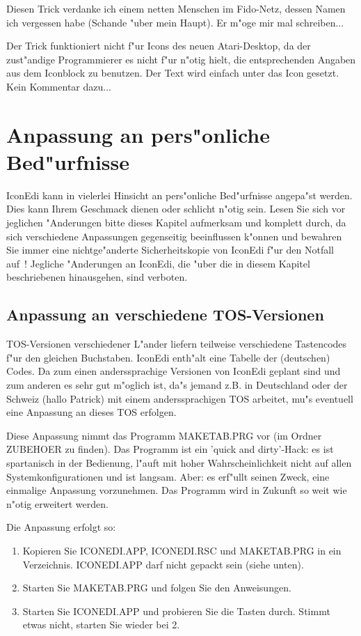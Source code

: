 Diesen Trick verdanke ich einem netten Menschen im Fido-Netz, dessen
Namen ich vergessen habe (Schande "uber mein Haupt). Er m"oge mir mal 
schreiben...

Der Trick funktioniert nicht f"ur Icons des neuen Atari-Desktop,
da der zust"andige Programmierer es nicht f"ur n"otig hielt, die
entsprechenden Angaben aus dem Iconblock zu benutzen. Der Text
wird einfach unter das Icon gesetzt. Kein Kommentar dazu...


%
\chapter{Anpassung an pers"onliche Bed"urfnisse}
IconEdi kann in vielerlei Hinsicht an pers"onliche Bed"urfnisse
angepa"st werden. Dies kann Ihrem Geschmack dienen oder schlicht 
n"otig sein. Lesen Sie sich vor jeglichen "Anderungen bitte dieses
Kapitel aufmerksam und komplett durch, da sich verschiedene 
Anpassungen gegenseitig beeinflussen k"onnen und bewahren Sie immer 
eine nichtge"anderte Sicherheitskopie von IconEdi f"ur den Notfall 
auf~! Jegliche "Anderungen an IconEdi, die "uber die in diesem 
Kapitel beschriebenen hinausgehen, sind verboten.

\section{Anpassung an verschiedene TOS-Versionen}
TOS-Versionen verschiedener L"ander liefern teilweise
verschiedene Tastencodes f"ur den gleichen Buchstaben.
IconEdi enth"alt eine Tabelle der (deutschen) Codes.
Da zum einen anderssprachige Versionen von IconEdi geplant
sind und zum anderen es sehr gut m"oglich ist, da"s jemand
z.B. in Deutschland oder der Schweiz (hallo Patrick) mit einem 
anderssprachigen TOS arbeitet, mu"s eventuell eine Anpassung 
an dieses TOS erfolgen.

Diese Anpassung nimmt das Programm MAKETAB.PRG vor (im Ordner
ZUBEHOER zu finden). Das Programm ist ein 'quick and dirty'-Hack:
es ist spartanisch in der Bedienung, l"auft mit hoher 
Wahrscheinlichkeit nicht auf allen Systemkonfigurationen und ist
langsam. Aber: es erf"ullt seinen Zweck, eine einmalige Anpassung
vorzunehmen. Das Programm wird in Zukunft so weit wie n"otig
erweitert werden.

Die Anpassung erfolgt so:
\begin{enumerate}
 \item Kopieren Sie ICONEDI.APP, ICONEDI.RSC und MAKETAB.PRG in 
       ein Verzeichnis. ICONEDI.APP darf nicht gepackt sein 
       (siehe unten).
 \item Starten Sie MAKETAB.PRG und folgen Sie den Anweisungen.
 \item Starten Sie ICONEDI.APP und probieren Sie die Tasten durch.
       Stimmt etwas nicht, starten Sie wieder bei 2.
\end{enumerate}

